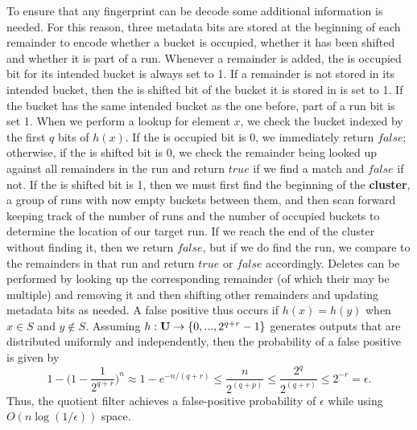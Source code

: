 \documentclass[../paper.tex]{subfiles}
\begin{document}
	To ensure that any fingerprint can be decode some additional information is needed.   For this reason, three metadata bits are stored at the beginning of each remainder to encode whether a bucket is occupied, whether it has been shifted and whether it is part of a run.  Whenever a remainder is added, the is occupied bit for its intended bucket is always set to 1.  If a remainder is not stored in its intended bucket, then the is shifted bit of the bucket it is stored in is set to 1.  If the bucket has the same intended bucket as the one before, part of a run bit is set 1.  When we perform a lookup for element $x$, we check the bucket indexed by the first $q$ bits of $h(x)$.  If the is occupied bit is 0, we immediately return $false$; otherwise, if the is shifted bit is 0, we check the remainder being looked up against all remainders in the run and return $true$ if we find a match and $false$ if not.  If the is shifted bit is 1, then we must first find the beginning of the {\bf cluster}, a group of runs with now empty buckets between them, and then scan forward keeping track of the number of runs and the number of occupied buckets to determine the location of our target run.  If we reach the end of the cluster without finding it, then we return $false$, but if we do find the run, we compare to the remainders in that run and return $true$ or $false$ accordingly.  Deletes can be performed by looking up the corresponding remainder (of which their may be multiple) and removing it and then shifting other remainders and updating metadata bits as needed.  A false positive thus occurs if $h(x) = h(y)$ when $x \in S$ and $y \notin S$.  Assuming $h: {\bf U} \rightarrow \{0, ... , 2^{q+r}-1\}$ generates outputs that are distributed uniformly and independently, then the probability of a false positive is given by 
	$$ 1 - \big(1 - \frac{1}{2^{q+r}}\big)^n \approx 1- e^{-n/(q+r)} \leq \frac{n}{2^{(q+p)}} \leq \frac{2^q}{2^{(q+r)}} \leq 2^{-r} = \epsilon .$$
Thus, the quotient filter achieves a false-positive probability of $\epsilon$ while using $O(n \log (1/\epsilon))$ space.  	
\end{document}
